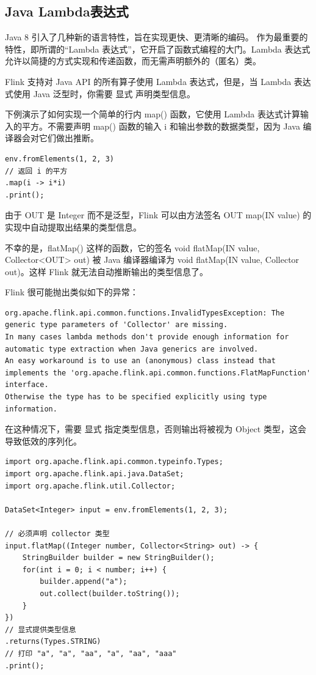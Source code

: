 \documentclass[cn,11pt,chinese]{elegantbook}
\begin{document}
\subsection{Java Lambda表达式}

Java 8 引入了几种新的语言特性，旨在实现更快、更清晰的编码。 作为最重要的特性，即所谓的“Lambda 表达式”，它开启了函数式编程的大门。Lambda 表达式允许以简捷的方式实现和传递函数，而无需声明额外的（匿名）类。

\begin{note}
Flink 支持对 Java API 的所有算子使用 Lambda 表达式，但是，当 Lambda 表达式使用 Java 泛型时，你需要 显式 声明类型信息。
\end{note}

下例演示了如何实现一个简单的行内 map() 函数，它使用 Lambda 表达式计算输入的平方。不需要声明 map() 函数的输入 i 和输出参数的数据类型，因为 Java 编译器会对它们做出推断。

\begin{verbatim}
env.fromElements(1, 2, 3)
// 返回 i 的平方
.map(i -> i*i)
.print();
\end{verbatim}

由于 OUT 是 Integer 而不是泛型，Flink 可以由方法签名 OUT map(IN value) 的实现中自动提取出结果的类型信息。

不幸的是，flatMap() 这样的函数，它的签名 void flatMap(IN value, Collector<OUT> out) 被 Java 编译器编译为 void flatMap(IN value, Collector out)。这样 Flink 就无法自动推断输出的类型信息了。

Flink 很可能抛出类似如下的异常：

\begin{verbatim}
org.apache.flink.api.common.functions.InvalidTypesException: The generic type parameters of 'Collector' are missing.
In many cases lambda methods don't provide enough information for automatic type extraction when Java generics are involved.
An easy workaround is to use an (anonymous) class instead that implements the 'org.apache.flink.api.common.functions.FlatMapFunction' interface.
Otherwise the type has to be specified explicitly using type information.
\end{verbatim}

在这种情况下，需要 显式 指定类型信息，否则输出将被视为 Object 类型，这会导致低效的序列化。

\begin{verbatim}
import org.apache.flink.api.common.typeinfo.Types;
import org.apache.flink.api.java.DataSet;
import org.apache.flink.util.Collector;

DataSet<Integer> input = env.fromElements(1, 2, 3);

// 必须声明 collector 类型
input.flatMap((Integer number, Collector<String> out) -> {
    StringBuilder builder = new StringBuilder();
    for(int i = 0; i < number; i++) {
        builder.append("a");
        out.collect(builder.toString());
    }
})
// 显式提供类型信息
.returns(Types.STRING)
// 打印 "a", "a", "aa", "a", "aa", "aaa"
.print();
\end{verbatim}
\end{document}
